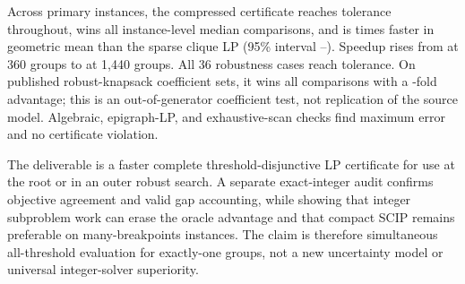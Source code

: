 \documentclass[11pt]{article}
\begin{document}
Across \PubPrimaryCases{} primary instances, the compressed certificate reaches tolerance throughout, wins all \PubPrimaryWins{} instance-level median comparisons, and is \PubPrimaryGeoSpeedup{} times faster in geometric mean than the sparse clique LP (95\% interval \PubPrimaryCILow--\PubPrimaryCIHigh).  Speedup rises from \PubPrimaryNLowSpeedup{} at 360 groups to \PubPrimaryNHighSpeedup{} at 1,440 groups.  All 36 robustness cases reach tolerance.  On \PubExternalCases{} published robust-knapsack coefficient sets, it wins all \PubExternalWins{} comparisons with a \PubExternalGeoSpeedup-fold advantage; this is an out-of-generator coefficient test, not replication of the source model.  Algebraic, epigraph-LP, and exhaustive-scan checks find maximum error \PubValidationMaxError{} and no certificate violation.

The deliverable is a faster complete threshold-disjunctive LP certificate for use at the root or in an outer robust search.  A separate exact-integer audit confirms objective agreement and valid gap accounting, while showing that integer subproblem work can erase the oracle advantage and that compact SCIP remains preferable on many-breakpoints instances.  The claim is therefore simultaneous all-threshold evaluation for exactly-one groups, not a new uncertainty model or universal integer-solver superiority.
\end{document}
